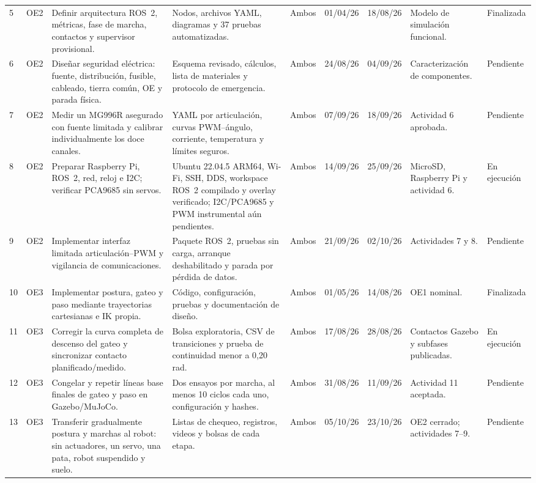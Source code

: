 \documentclass[10pt,letterpaper]{article}
\newcommand{\finalizada}{\cellcolor{verde}Finalizada}
\newcommand{\ejecucion}{\cellcolor{amarillo}En ejecución}
\newcommand{\pendiente}{\cellcolor{gris}Pendiente}
\begin{document}
\begin{landscape}
\begin{longtable}{p{0.55cm}p{0.65cm}p{4.2cm}p{4.0cm}p{1.3cm}p{1.35cm}p{1.35cm}p{3.7cm}p{1.5cm}}
5 & OE2 & Definir arquitectura ROS~2, métricas, fase de marcha, contactos y supervisor provisional. & Nodos, archivos YAML, diagramas y 37 pruebas automatizadas. & Ambos & 01/04/26 & 18/08/26 & Modelo de simulación funcional. & \finalizada\\
6 & OE2 & Diseñar seguridad eléctrica: fuente, distribución, fusible, cableado, tierra común, OE y parada física. & Esquema revisado, cálculos, lista de materiales y protocolo de emergencia. & Ambos & 24/08/26 & 04/09/26 & Caracterización de componentes. & \pendiente\\
7 & OE2 & Medir un MG996R asegurado con fuente limitada y calibrar individualmente los doce canales. & YAML por articulación, curvas PWM--ángulo, corriente, temperatura y límites seguros. & Ambos & 07/09/26 & 18/09/26 & Actividad 6 aprobada. & \pendiente\\
8 & OE2 & Preparar Raspberry Pi, ROS~2, red, reloj e I2C; verificar PCA9685 sin servos. & Ubuntu 22.04.5 ARM64, Wi-Fi, SSH, DDS, workspace ROS~2 compilado y overlay verificado; I2C/PCA9685 y PWM instrumental aún pendientes. & Ambos & 14/09/26 & 25/09/26 & MicroSD, Raspberry Pi y actividad 6. & \ejecucion\\
9 & OE2 & Implementar interfaz limitada articulación--PWM y vigilancia de comunicaciones. & Paquete ROS~2, pruebas sin carga, arranque deshabilitado y parada por pérdida de datos. & Ambos & 21/09/26 & 02/10/26 & Actividades 7 y 8. & \pendiente\\
10 & OE3 & Implementar postura, gateo y paso mediante trayectorias cartesianas e IK propia. & Código, configuración, pruebas y documentación de diseño. & Ambos & 01/05/26 & 14/08/26 & OE1 nominal. & \finalizada\\
11 & OE3 & Corregir la curva completa de descenso del gateo y sincronizar contacto planificado/medido. & Bolsa exploratoria, CSV de transiciones y prueba de continuidad menor a 0,20 rad. & Ambos & 17/08/26 & 28/08/26 & Contactos Gazebo y subfases publicadas. & \ejecucion\\
12 & OE3 & Congelar y repetir líneas base finales de gateo y paso en Gazebo/MuJoCo. & Dos ensayos por marcha, al menos 10 ciclos cada uno, configuración y hashes. & Ambos & 31/08/26 & 11/09/26 & Actividad 11 aceptada. & \pendiente\\
13 & OE3 & Transferir gradualmente postura y marchas al robot: sin actuadores, un servo, una pata, robot suspendido y suelo. & Listas de chequeo, registros, videos y bolsas de cada etapa. & Ambos & 05/10/26 & 23/10/26 & OE2 cerrado; actividades 7--9. & \pendiente\\

\end{longtable}
\end{landscape}
\end{document}
